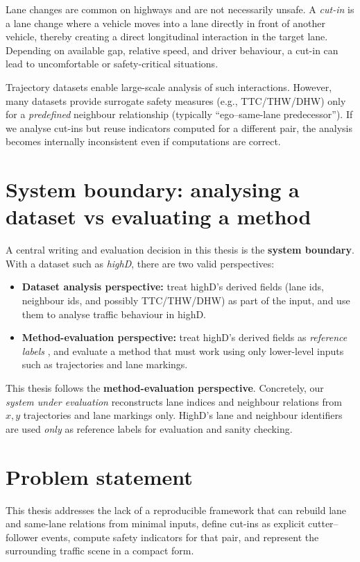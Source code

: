 \documentclass[12pt,a4paper,twoside,openright]{report}
\begin{document}
    Lane changes are common on highways and are not necessarily unsafe. A \emph{cut-in} is a lane change where a vehicle moves into a lane directly in front of another vehicle, thereby creating a direct longitudinal interaction in the target lane. Depending on available gap, relative speed, and driver behaviour, a cut-in can lead to uncomfortable or safety-critical situations.

    Trajectory datasets enable large-scale analysis of such interactions. However, many datasets provide surrogate safety measures (e.g., TTC/THW/DHW) only for a \emph{predefined} neighbour relationship (typically ``ego--same-lane predecessor''). If we analyse cut-ins but reuse indicators computed for a different pair, the analysis becomes internally inconsistent even if computations are correct.

    \section{System boundary: analysing a dataset vs evaluating a method}
    A central writing and evaluation decision in this thesis is the \textbf{system boundary}. With a dataset such as \textit{highD}, there are two valid perspectives:

    \begin{itemize}[leftmargin=1.2em]
  \item \textbf{Dataset analysis perspective:} treat highD's derived fields (lane ids, neighbour ids, and possibly TTC/THW/DHW) as part of the input, and use them to analyse traffic behaviour in highD.
  \item \textbf{Method-evaluation perspective:} treat highD's derived fields as \emph{reference labels} , and evaluate a method that must work using only lower-level inputs such as trajectories and lane markings.
    \end{itemize}

    This thesis follows the \textbf{method-evaluation perspective}. Concretely, our \emph{system under evaluation} reconstructs lane indices and neighbour relations from $x,y$ trajectories and lane markings only. HighD's lane and neighbour identifiers are used \emph{only} as reference labels for evaluation and sanity checking.

    \section{Problem statement}
    This thesis addresses the lack of a reproducible framework that can rebuild lane and same-lane relations from minimal inputs, define cut-ins as explicit cutter--follower events, compute safety indicators for that pair, and represent the surrounding traffic scene in a compact form.
\end{document}
